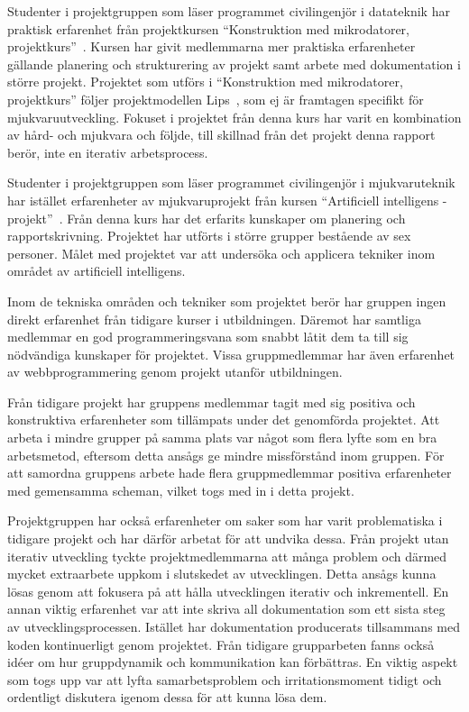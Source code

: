 Studenter i projektgruppen som läser programmet civilingenjör i datateknik har praktisk erfarenhet från projektkursen ``Konstruktion med mikrodatorer, projektkurs''~\cite{tsea29}. Kursen har givit medlemmarna mer praktiska erfarenheter gällande planering och strukturering av projekt samt arbete med dokumentation i större projekt. Projektet som utförs i ``Konstruktion med mikrodatorer, projektkurs'' följer projektmodellen Lips~\cite{lips}, som ej är framtagen specifikt för mjukvaruutveckling. Fokuset i projektet från denna kurs har varit en kombination av hård- och mjukvara och följde, till skillnad från det projekt denna rapport berör, inte en iterativ arbetsprocess.

Studenter i projektgruppen som läser programmet civilingenjör i mjukvaruteknik har istället erfarenheter av mjukvaruprojekt från kursen ``Artificiell intelligens - projekt''~\cite{tddd92}. Från denna kurs har det erfarits kunskaper om planering och rapportskrivning. Projektet har utförts i större grupper bestående av sex personer. Målet med projektet var att undersöka och applicera tekniker inom området av artificiell intelligens. 

Inom de tekniska områden och tekniker som projektet berör har gruppen ingen direkt erfarenhet från tidigare kurser i utbildningen. Däremot har samtliga medlemmar en god programmeringsvana som snabbt låtit dem ta till sig nödvändiga kunskaper för projektet. Vissa gruppmedlemmar har även erfarenhet av webbprogrammering genom projekt utanför utbildningen.

Från tidigare projekt har gruppens medlemmar tagit med sig positiva och konstruktiva erfarenheter som tillämpats under det genomförda projektet. Att arbeta i mindre grupper på samma plats var något som flera lyfte som en bra arbetsmetod, eftersom detta ansågs ge mindre missförstånd inom gruppen. För att samordna gruppens arbete hade flera gruppmedlemmar positiva erfarenheter med gemensamma scheman, vilket togs med in i detta projekt.

Projektgruppen har också erfarenheter om saker som har varit problematiska i tidigare projekt och har därför arbetat för att undvika dessa. Från projekt utan iterativ utveckling tyckte projektmedlemmarna att många problem och därmed mycket extraarbete uppkom i slutskedet av utvecklingen. Detta ansågs kunna lösas genom att fokusera på att hålla utvecklingen iterativ och inkrementell. En annan viktig erfarenhet var att inte skriva all dokumentation som ett sista steg av utvecklingsprocessen. Istället har dokumentation producerats tillsammans med koden kontinuerligt genom projektet. Från tidigare grupparbeten fanns också idéer om hur gruppdynamik och kommunikation kan förbättras. En viktig aspekt som togs upp var att lyfta samarbetsproblem och irritationsmoment tidigt och ordentligt diskutera igenom dessa för att kunna lösa dem.
